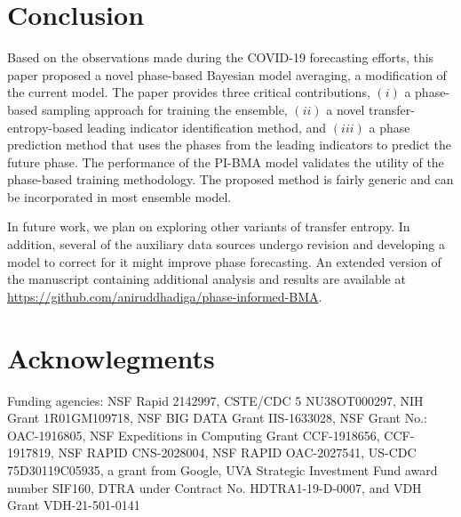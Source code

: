 \documentclass[conference,compsoc]{IEEEtran}
\begin{document}


\section{Conclusion}
Based on the observations made during the COVID-19 forecasting efforts, this paper proposed a novel phase-based Bayesian model averaging, a modification of the current model. The paper provides three critical contributions, $(i)$ a phase-based sampling approach for training the ensemble, $(ii)$ a novel transfer-entropy-based leading indicator identification method, and $(iii)$ a phase prediction method that uses the phases from the leading indicators to predict the future phase. The performance of the PI-BMA model validates the utility of the  phase-based training methodology. The proposed method is fairly generic and can be incorporated in most ensemble model.

In future work, we plan on exploring other variants of transfer entropy. In addition, several of the auxiliary data sources undergo revision and developing a model to correct for it might improve phase forecasting. An extended version of the manuscript containing additional analysis and results are available at \url{https://github.com/aniruddhadiga/phase-informed-BMA}. 

\section{Acknowlegments}
Funding agencies: NSF Rapid 2142997, CSTE/CDC 5 NU38OT000297, NIH Grant 1R01GM109718, NSF BIG DATA Grant IIS-1633028, NSF Grant No.: OAC-1916805, NSF Expeditions in Computing Grant CCF-1918656, CCF-1917819, NSF RAPID CNS-2028004, NSF RAPID OAC-2027541, US-CDC 75D30119C05935, a grant from Google, UVA Strategic Investment Fund award number SIF160, DTRA under Contract No. HDTRA1-19-D-0007, and VDH Grant VDH-21-501-0141



\end{document}
